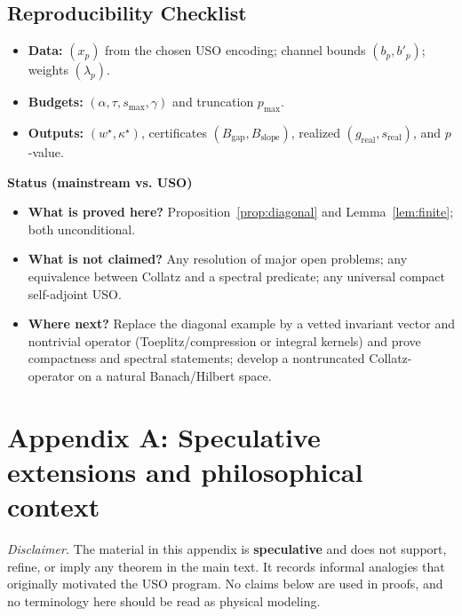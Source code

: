 \documentclass[11pt]{article}
\theoremstyle{definition}
\theoremstyle{remark}
\newcommand{\1}{\mathbf{1}}
\newenvironment{statusbox}{%
  \begin{tcolorbox}
  \textbf{Status (mainstream vs. USO)}\\[-0.5em]
  \begin{itemize}[leftmargin=1.2em,itemsep=0.25em]
}{\end{itemize}\end{tcolorbox}}
\begin{document}
\subsection{Reproducibility Checklist}
\begin{itemize}
\item \textbf{Data:} $(x_p)$ from the chosen USO encoding; channel bounds $(b_p,b'_p)$; weights $(\lambda_p)$.
\item \textbf{Budgets:} $(\alpha,\tau,s_{\max},\gamma)$ and truncation $p_{\max}$.
\item \textbf{Outputs:} $(w^\star,\kappa^\star)$, certificates $(B_{\mathrm{gap}},B_{\mathrm{slope}})$, realized $(g_{\mathrm{real}},s_{\mathrm{real}})$, and $p$-value.
\end{itemize}

\begin{statusbox}
  \item \textbf{What is proved here?} Proposition~\ref{prop:diagonal} and Lemma~\ref{lem:finite}; both unconditional.
  \item \textbf{What is not claimed?} Any resolution of major open problems; any equivalence between Collatz and a spectral predicate; any universal compact self-adjoint USO.
  \item \textbf{Where next?} Replace the diagonal example by a vetted invariant vector and nontrivial operator (Toeplitz/compression or integral kernels) and prove compactness and spectral statements; develop a nontruncated Collatz-operator on a natural Banach/Hilbert space.
\end{statusbox}

\section*{Appendix A: Speculative extensions and philosophical context}
\noindent\textit{Disclaimer.} The material in this appendix is \textbf{speculative} and does not support, refine, or imply any theorem in the main text. It records informal analogies that originally motivated the USO program. No claims below are used in proofs, and no terminology here should be read as physical modeling.
\end{document}
